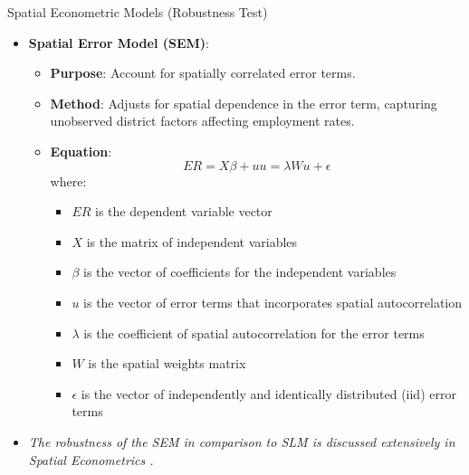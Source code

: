\documentclass[10pt]{beamer}
\begin{document}
\begin{frame}{Spatial Econometric Models (Robustness Test)}
    \begin{itemize}
     \item \textbf{Spatial Error Model (SEM)}:
    \begin{itemize}
        \item \textbf{Purpose}: Account for spatially correlated error terms.
        \item \textbf{Method}: Adjusts for spatial dependence in the error term, capturing unobserved district factors affecting employment rates.
        \item \textbf{Equation}:
        \begin{subequations}
          \begin{equation}
              ER = X\beta + u
          \end{equation}
          \begin{equation}
              u = \lambda Wu + \epsilon
          \end{equation}
          \end{subequations}
        where:
\begin{itemize}
  \item \( ER \) is the dependent variable vector
  \item \( X \) is the matrix of independent variables
  \item \( \beta \) is the vector of coefficients for the independent variables
  \item \( u \) is the vector of error terms that incorporates spatial autocorrelation
  \item \( \lambda \) is the coefficient of spatial autocorrelation for the error terms
  \item \( W \) is the spatial weights matrix
  \item \( \epsilon \) is the vector of independently and identically distributed (iid) error terms
\end{itemize}
    \end{itemize}
    \item \textit{The robustness of the SEM in comparison to SLM is discussed extensively in Spatial Econometrics \parencites{anselin1988}{elhorst2014}.}
\end{itemize}
\end{frame}
\end{document}
